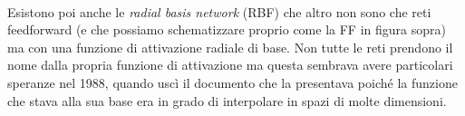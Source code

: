 \begin{figure}[hbtb]
\centering
{} \quad
{} \quad
{}\\

\label{fig:subfig}
\end{figure}

Esistono poi anche le \textit{radial basis network} (RBF) che altro non sono che reti feedforward (e che possiamo schematizzare proprio come la FF in figura sopra) ma con una funzione di attivazione radiale di base. Non tutte le reti prendono il nome dalla propria funzione di attivazione ma questa sembrava avere particolari speranze nel 1988, quando uscì il documento che la presentava poiché la funzione che stava alla sua base era in grado di interpolare in spazi di molte dimensioni\cite{broomhead1988radial}.
 
